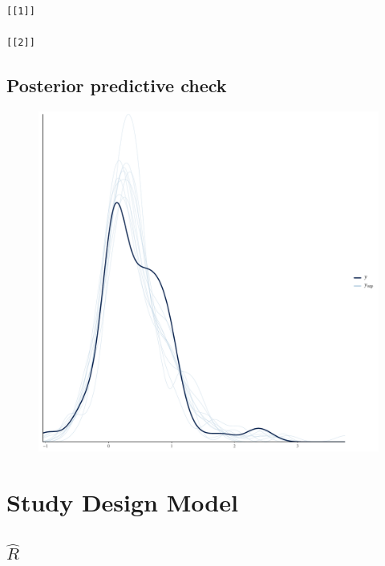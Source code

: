 \documentclass[
]{report}
\begin{document}
\begin{verbatim}
[[1]]

[[2]]
\end{verbatim}

\hypertarget{posterior-predictive-check-8}{%
\section{Posterior predictive
check}\label{posterior-predictive-check-8}}

\begin{figure}

{\centering \includegraphics[width=1\textwidth,height=\textheight]{diagnostic_plots_files/figure-pdf/unnamed-chunk-27-1.pdf}

}

\end{figure}

\hypertarget{study-design-model}{%
\chapter{Study Design Model}\label{study-design-model}}

\hypertarget{hatr-9}{%
\section{\texorpdfstring{\(\hat{R}\)}{\textbackslash hat\{R\}}}\label{hatr-9}}
\end{document}
